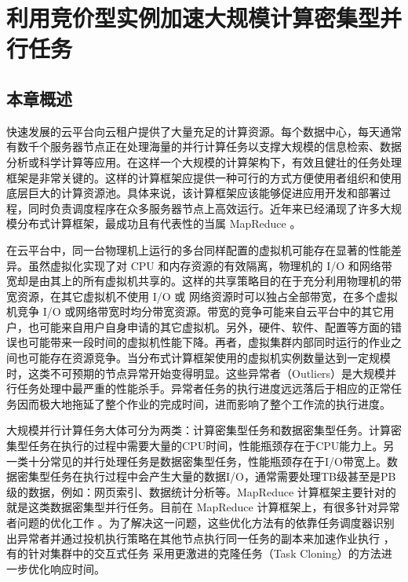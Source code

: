 \chapter{利用竞价型实例加速大规模计算密集型并行任务}
\label{cha:no2}

\section{本章概述}
\label{sec:no2_intro}
快速发展的云平台向云租户提供了大量充足的计算资源。每个数据中心，每天通常有数千个服务器节点正在处理海量的并行计算任务以支撑大规模的信息检索、数据分析或科学计算等应用。在这样一个大规模的计算架构下，有效且健壮的任务处理框架是非常关键的。这样的计算框架应提供一种可行的方式方便使用者组织和使用底层巨大的计算资源池。具体来说，该计算框架应该能够促进应用开发和部署过程，同时负责调度程序在众多服务器节点上高效运行。近年来已经涌现了许多大规模分布式计算框架，最成功且有代表性的当属 MapReduce \cite{Dean:2004:MSD:1251254.1251264}。

在云平台中，同一台物理机上运行的多台同样配置的虚拟机可能存在显著的性能差异。虽然虚拟化实现了对 CPU 和内存资源的有效隔离，物理机的 I/O 和网络带宽却是由其上的所有虚拟机共享的。这样的共享策略目的在于充分利用物理机的带宽资源，在其它虚拟机不使用 I/O 或 网络资源时可以独占全部带宽，在多个虚拟机竞争 I/O 或网络带宽时均分带宽资源。带宽的竞争可能来自云平台中的其它用户，也可能来自用户自身申请的其它虚拟机。另外，硬件、软件、配置等方面的错误也可能带来一段时间的虚拟机性能下降。再者，虚拟集群内部同时运行的作业之间也可能存在资源竞争。当分布式计算框架使用的虚拟机实例数量达到一定规模时，这类不可预期的节点异常开始变得明显。这些异常者（Outliers）是大规模并行任务处理中最严重的性能杀手。异常者任务的执行进度远远落后于相应的正常任务因而极大地拖延了整个作业的完成时间，进而影响了整个工作流的执行进度。

大规模并行计算任务大体可分为两类：计算密集型任务和数据密集型任务。计算密集型任务在执行的过程中需要大量的CPU时间，性能瓶颈存在于CPU能力上。另一类十分常见的并行处理任务是数据密集型任务，性能瓶颈存在于I/O带宽上。数据密集型任务在执行过程中会产生大量的数据I/O，通常需要处理TB级甚至是PB级的数据，例如：网页索引、数据统计分析等。MapReduce 计算框架主要针对的就是这类数据密集型并行任务。目前在 MapReduce 计算框架上，有很多针对异常者问题的优化工作 \cite{Zaharia:2008:IMP:1855741.1855744, Ananthanarayanan:2010:ROM:1924943.1924962, 180304, Dean:2013:TS:2408776.2408794}。为了解决这一问题，这些优化方法有的依靠任务调度器识别出异常者并通过投机执行策略在其他节点执行同一任务的副本来加速作业执行 \cite{Zaharia:2008:IMP:1855741.1855744, Ananthanarayanan:2010:ROM:1924943.1924962}，有的针对集群中的交互式任务 \cite{180304, Dean:2013:TS:2408776.2408794} 采用更激进的克隆任务（Task Cloning）的方法进一步优化响应时间。

